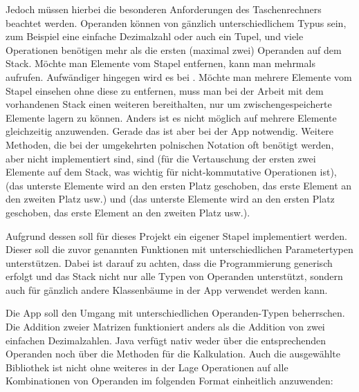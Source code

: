 Jedoch müssen hierbei die besonderen Anforderungen des Taschenrechners beachtet werden. Operanden können von gänzlich unterschiedlichem Typus sein, zum Beispiel eine einfache Dezimalzahl oder auch ein Tupel, und viele Operationen benötigen mehr als die ersten (maximal zwei) Operanden auf dem Stack. Möchte man Elemente vom Stapel entfernen, kann man  mehrmals aufrufen. Aufwändiger hingegen wird es bei . Möchte man mehrere Elemente vom Stapel einsehen ohne diese zu entfernen, muss man bei der Arbeit mit dem vorhandenen Stack einen weiteren bereithalten, nur um zwischengespeicherte Elemente lagern zu können. Anders ist es nicht möglich  auf mehrere Elemente gleichzeitig anzuwenden. Gerade das ist aber bei der App notwendig. Weitere Methoden, die bei der umgekehrten polnischen Notation oft benötigt werden, aber nicht implementiert sind, sind  (für die Vertauschung der ersten zwei Elemente auf dem Stack, was wichtig für nicht-kommutative Operationen ist),  (das unterste Elemente wird an den ersten Platz geschoben, das erste Element an den zweiten Platz usw.) und  (das unterste Elemente wird an den ersten Platz geschoben, das erste Element an den zweiten Platz usw.).

Aufgrund dessen soll für dieses Projekt ein eigener Stapel implementiert werden. Dieser soll die zuvor genannten Funktionen mit unterschiedlichen Parametertypen unterstützen. Dabei ist darauf zu achten, dass die Programmierung generisch erfolgt und das Stack nicht nur alle Typen von Operanden unterstützt, sondern auch für gänzlich andere Klassenbäume in der App verwendet werden kann.


Die App soll den Umgang mit unterschiedlichen Operanden-Typen beherrschen. Die Addition zweier Matrizen funktioniert anders als die Addition von zwei einfachen Dezimalzahlen. Java verfügt nativ weder über die entsprechenden Operanden noch über die Methoden für die Kalkulation. Auch die ausgewählte Bibliothek ist nicht ohne weiteres in der Lage Operationen auf alle Kombinationen von Operanden im folgenden Format einheitlich anzuwenden:


